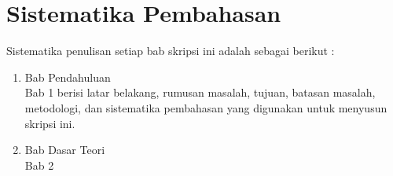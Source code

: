 \section{Sistematika Pembahasan}
\label{sec:sispem}
Sistematika penulisan setiap bab skripsi ini adalah sebagai berikut :
\begin{enumerate}
	\item Bab Pendahuluan \\
	Bab 1 berisi latar belakang, rumusan masalah, tujuan, batasan masalah, metodologi, dan sistematika pembahasan yang digunakan untuk menyusun skripsi ini.
	\item Bab Dasar Teori \\
	Bab 2
\end{enumerate}
